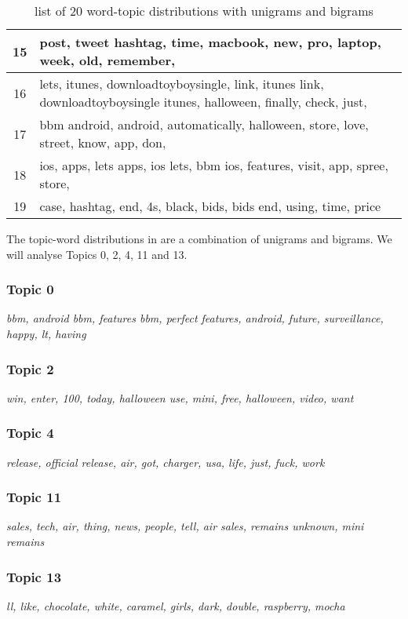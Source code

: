 \begin{table}
\begin{tabular}{c p{16cm}}
    15    & post, tweet hashtag, time, macbook, new, pro, laptop, week, old, remember, \\ \midrule
    16    & lets, itunes, downloadtoyboysingle, link, itunes link, downloadtoyboysingle itunes, halloween, finally, check, just, \\ \midrule
    17    & bbm android, android, automatically, halloween, store, love, street, know, app, don, \\ \midrule
    18    & ios, apps, lets apps, ios lets, bbm ios, features, visit, app, spree, store, \\ \midrule
    19    & case, hashtag, end, 4s, black, bids, bids end, using, time, price \\ \bottomrule
  \end{tabular}
  \caption{list of 20 word-topic distributions with unigrams and bigrams}
  \label{tab:unigrams_bigrams_lda}
\end{table}

The topic-word distributions in  are a combination of unigrams
and bigrams. We will analyse Topics 0, 2, 4, 11 and 13.


\subsubsection{Topic 0}
\label{sec:topic_0}
\textit{bbm, android bbm, features bbm, perfect features, android, future, surveillance, happy, lt,
having}

\subsubsection{Topic 2}
\label{sec:topic_2}
\textit{win, enter, 100, today, halloween use, mini, free, halloween, video, want}

\subsubsection{Topic 4}
\label{sec:topic_4}
\textit{release, official release, air, got, charger, usa, life, just, fuck, work}

\subsubsection{Topic 11}
\label{sec:topic_11}
\textit{sales, tech, air, thing, news, people, tell, air sales, remains unknown, mini remains}

\subsubsection{Topic 13}
\label{sec:topic_13}
\textit{ll, like, chocolate, white, caramel, girls, dark, double, raspberry, mocha}

